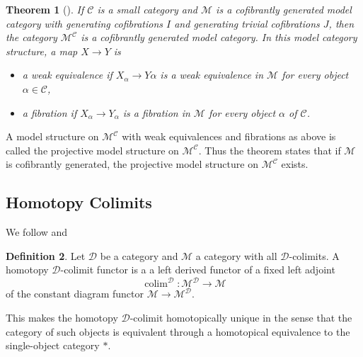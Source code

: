 \documentclass{scrartcl}
\theoremstyle{plain}
\newtheorem{theorem}{Theorem}[section]
\theoremstyle{definition}
\newtheorem{definition}[theorem]{Definition}
\newcommand{\cat}[1]{\mathcal{#1}}
\renewcommand{\epsilon}{\varepsilon}
\newcommand{\nto}{\Rightarrow}
\newcommand{\xnto}{\xRightarrow}
\DeclareMathOperator{\colim}{colim}
\DeclareMathOperator{\Ho}{Ho}
\newcommand{\comp}{\mathbin{\circ}}
\begin{document}
\begin{theorem}[{\cite[11.6.1]{hirschhorn2003model}}]
    If $\cat C$ is a small category and $\cat M$ is a cofibrantly generated model category with generating cofibrations $I$ and generating trivial cofibrations $J$, then the category $\cat M^{\cat C}$ is a cofibrantly generated model category. In this model category structure, a map $X\to Y$ is 
    \begin{itemize}
        \item a weak equivalence if $X_\alpha \to Y\alpha$ is a weak equivalence in $\cat M$ for every object $\alpha\in\cat C$,
        \item a fibration if $X_\alpha\to Y_\alpha$ is a fibration in $\cat M$ for every object $\alpha$ of $\cat C$.
    \end{itemize}
\end{theorem}
A model structure on $\cat M^{\cat C}$ with weak equivalences and fibrations as above is called the projective model structure on $\cat M^{\cat C}$. Thus the theorem states that if $\cat M$ is cofibrantly generated, the projective model structure on $\cat M^{\cat C}$ exists. 


\subsection{Homotopy Colimits}
We follow \cite[Chapter 5-6]{riehl_2014} and \cite[Section 19-21]{dwyer2004homotopy}
\begin{definition}
    Let $\cat D$ be a category and $\cat M$ a category with all $\cat D$-colimits. A homotopy $\cat D$-colimit functor is a a left derived functor of a fixed left adjoint 
    $$\colim^{\cat D}\colon \cat M^{\cat D}\to \cat M$$
    of the constant diagram functor $\cat M\to\cat M^{\cat D}$.
\end{definition}
This makes the homotopy $\cat D$-colimit homotopically unique in the sense that the category of such objects is equivalent through a homotopical equivalence to the single-object category $*$.
\end{document}
